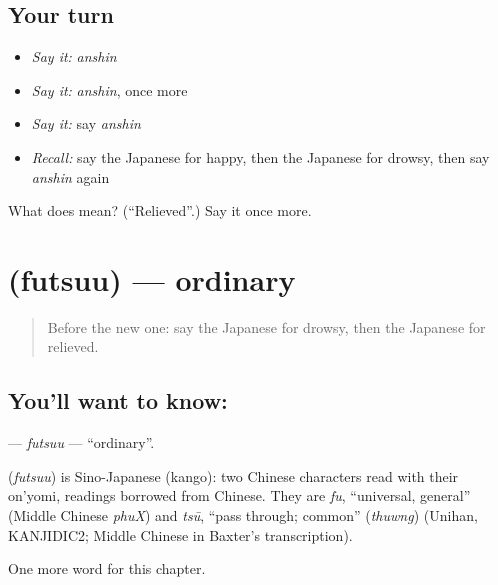 \subsection*{Your turn}
\begin{itemize}
\raggedright
  \item \emph{Say it:} \emph{anshin}
  \item \emph{Say it:} \emph{anshin}, once more
  \item \emph{Say it:} say \emph{anshin}
  \item \emph{Recall:} say the Japanese for happy, then the Japanese for drowsy, then say \emph{anshin} again
\end{itemize}

\begin{tcolorbox}[breakable,colback=teal!4,colframe=teal!35!black,title={Before you move on}]
What does  mean? (\textquotedblleft{}Relieved\textquotedblright{}.) Say it once more.
\end{tcolorbox}
\section[\texorpdfstring{\ja{ふつう} (futsuu)}{ふつう (futsuu)}]{ (futsuu) — ordinary}

\label{lesson:JA-C126-futsuu}



\begin{quote}
Before the new one: say the Japanese for drowsy, then the Japanese for relieved.
\end{quote}

\subsection*{You'll want to know: }
\textbf{} — \emph{futsuu} — \textquotedblleft{}ordinary\textquotedblright{}.

\begin{cousinweb}
\textbf{} (\emph{futsuu}) is Sino-Japanese (kango): two Chinese characters read with their on'yomi, readings borrowed from Chinese. They are \emph{fu}, \textquotedblleft{}universal, general\textquotedblright{} (Middle Chinese \emph{phuX}) and \emph{tsū}, \textquotedblleft{}pass through; common\textquotedblright{} (\emph{thuwng}) (Unihan, KANJIDIC2; Middle Chinese in Baxter's transcription).
\end{cousinweb}

\begin{grammarlens}[title={What you've built}]
One more word for this chapter.
\end{grammarlens}

